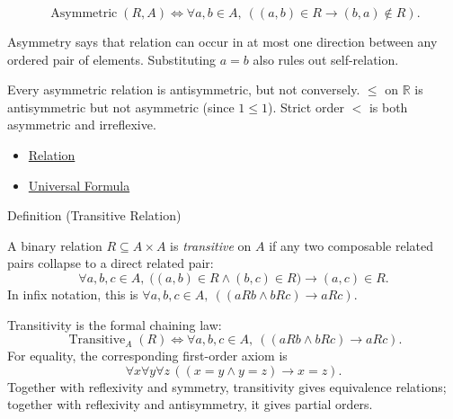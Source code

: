 \begin{remark*}
\[
  \operatorname{Asymmetric}(R,A)
  \iff
  \forall a,b\in A,\ ((a,b)\in R\to (b,a)\notin R).
\]
\end{remark*}

\begin{remark*}[Interpretation]
Asymmetry says that relation can occur in at most one direction between any
ordered pair of elements. Substituting $a=b$ also rules out self-relation.
\end{remark*}

\begin{remark*}[Exposition]
Every asymmetric relation is antisymmetric, but not conversely. $\leq$ on
$\mathbb{R}$ is antisymmetric but not asymmetric (since $1 \leq 1$). Strict
order $<$ is both asymmetric and irreflexive.
\end{remark*}

\begin{dependencies}
\begin{itemize}
  \item \hyperref[def:relation]{Relation}
  \item \hyperref[def:universal-q]{Universal Formula}
\end{itemize}
\end{dependencies}

\begin{definitionbox}{Definition (Transitive Relation)}
\begin{definition}\label{def:transitive}
A binary relation $R\subseteq A\times A$ is \emph{transitive} on $A$ if any
two composable related pairs collapse to a direct related pair:
\[
  \forall a,b,c\in A,\;
  \bigl((a,b)\in R\land(b,c)\in R\bigr)\rightarrow(a,c)\in R.
\]
In infix notation, this is
$\forall a,b,c\in A,\ ((aRb\land bRc)\rightarrow aRc)$.
\end{definition}
\end{definitionbox}


\begin{remark*}
Transitivity is the formal chaining law:
\[
  \operatorname{Transitive}_A(R)
  \iff
  \forall a,b,c\in A,\ ((aRb\land bRc)\rightarrow aRc).
\]
For equality, the corresponding first-order axiom is
\[
  \forall x\forall y\forall z\,((x=y\land y=z)\rightarrow x=z).
\]
Together with reflexivity and symmetry, transitivity gives equivalence
relations; together with reflexivity and antisymmetry, it gives partial
orders.
\end{remark*}

